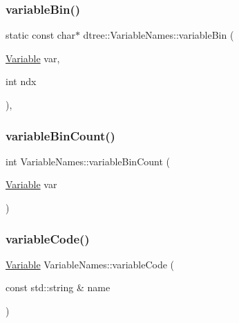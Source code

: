 \subsubsection{\texorpdfstring{variableBin()}{variableBin()}}
{\footnotesize\ttfamily static const char$\ast$ dtree\+::\+Variable\+Names\+::variable\+Bin (\begin{DoxyParamCaption}\item[{\mbox{\hyperlink{namespacedtree_a79fe30831a14df904319f9e783b3189b}{Variable}}}]{var,  }\item[{int}]{ndx }\end{DoxyParamCaption})\hspace{0.3cm}{\ttfamily [inline]}, {\ttfamily [static]}}

\mbox{\label{classdtree_1_1_variable_names_ab1bf52dec56ba3a391c1cb0a3734fa27}} 
\subsubsection{\texorpdfstring{variableBinCount()}{variableBinCount()}}
{\footnotesize\ttfamily int Variable\+Names\+::variable\+Bin\+Count (\begin{DoxyParamCaption}\item[{\mbox{\hyperlink{namespacedtree_a79fe30831a14df904319f9e783b3189b}{Variable}}}]{var }\end{DoxyParamCaption})\hspace{0.3cm}{\ttfamily [static]}}

\mbox{\label{classdtree_1_1_variable_names_a04a575b3bd46b5470146b25c115b660c}} 
\subsubsection{\texorpdfstring{variableCode()}{variableCode()}}
{\footnotesize\ttfamily \mbox{\hyperlink{namespacedtree_a79fe30831a14df904319f9e783b3189b}{Variable}} Variable\+Names\+::variable\+Code (\begin{DoxyParamCaption}\item[{const std\+::string \&}]{name }\end{DoxyParamCaption})\hspace{0.3cm}{\ttfamily [static]}}

